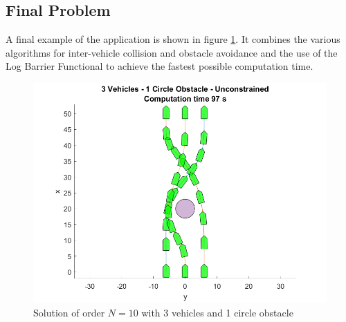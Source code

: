 \subsection{Final Problem}
\par A final example of the application is shown in figure \ref{fig:finalexample}. It combines the various algorithms for inter-vehicle collision and obstacle avoidance  and the use of the Log Barrier Functional to achieve the fastest possible computation time.

\begin{figure}[h!]
\centering
\includegraphics[width=\textwidth]{Images/results/finalexample.png}
\caption{Solution of order $N=10$ with 3 vehicles and 1 circle obstacle}
\label{fig:finalexample}
\end{figure}

